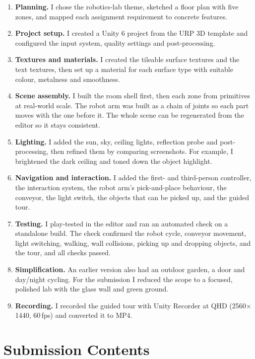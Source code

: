 \documentclass[11pt,a4paper]{article}
\begin{document}
\begin{enumerate}
  \item \textbf{Planning.} I chose the robotics-lab theme, sketched a floor plan with five zones, and mapped
        each assignment requirement to concrete features.
  \item \textbf{Project setup.} I created a Unity 6 project from the URP 3D template and configured the input
        system, quality settings and post-processing.
  \item \textbf{Textures and materials.} I created the tileable surface textures and the text textures, then
        set up a material for each surface type with suitable colour, metalness and smoothness.
  \item \textbf{Scene assembly.} I built the room shell first, then each zone from primitives at real-world
        scale. The robot arm was built as a chain of joints so each part moves with the one before it.
        The whole scene can be regenerated from the editor so it stays consistent.
  \item \textbf{Lighting.} I added the sun, sky, ceiling lights, reflection probe and post-processing, then
        refined them by comparing screenshots. For example, I brightened the dark ceiling and toned down the
        object highlight.
  \item \textbf{Navigation and interaction.} I added the first- and third-person controller, the
        interaction system, the robot arm's pick-and-place behaviour, the conveyor, the light switch, the
        objects that can be picked up, and the guided tour.
  \item \textbf{Testing.} I play-tested in the editor and ran an automated check on a standalone build. The check
        confirmed the robot cycle, conveyor movement, light switching, walking, wall collisions, picking up and
        dropping objects, and the tour, and all checks passed.
  \item \textbf{Simplification.} An earlier version also had an outdoor garden, a door and day/night cycling.
        For the submission I reduced the scope to a focused, polished lab with the glass wall and green ground.
  \item \textbf{Recording.} I recorded the guided tour with Unity Recorder at QHD (2560$\times$1440, 60\,fps)
        and converted it to MP4.
\end{enumerate}

\section{Submission Contents}
\end{document}
